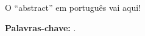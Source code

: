 \section*{\abstractnamept}

O ``abstract'' em português vai aqui!

\vfill

\textbf{\Large Palavras-chave:} \thesisPalavraasChave.
